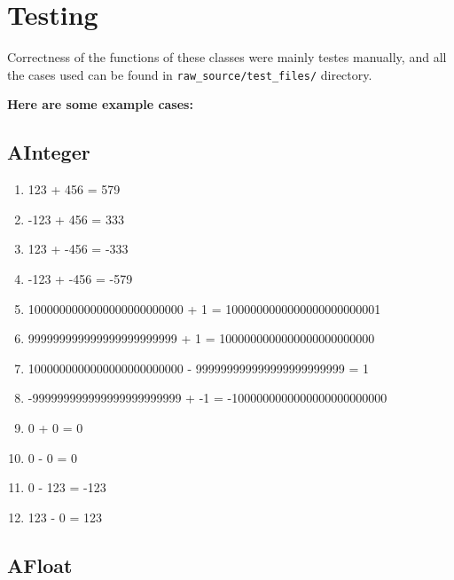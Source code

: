 \documentclass[15pt]{article}
\begin{document}
\section{Testing}

    Correctness of the functions of these classes were mainly testes manually, and all the
    cases used can be found in \texttt{raw\_source/test\_files/} directory.

    \textbf{Here are some example cases:}

    \subsection{AInteger}

    \begin{enumerate}
        \item 123 + 456 = 579
        \item -123 + 456 = 333
        \item 123 + -456 = -333
        \item -123 + -456 = -579
        \item 1000000000000000000000000 + 1 = 1000000000000000000000001
        \item 999999999999999999999999 + 1 = 1000000000000000000000000
        \item 1000000000000000000000000 - 999999999999999999999999 = 1
        \item -999999999999999999999999 + -1 = -1000000000000000000000000
        \item 0 + 0 = 0
        \item 0 - 0 = 0
        \item 0 - 123 = -123
        \item 123 - 0 = 123
    \end{enumerate}

    \subsection{AFloat}
\end{document}
